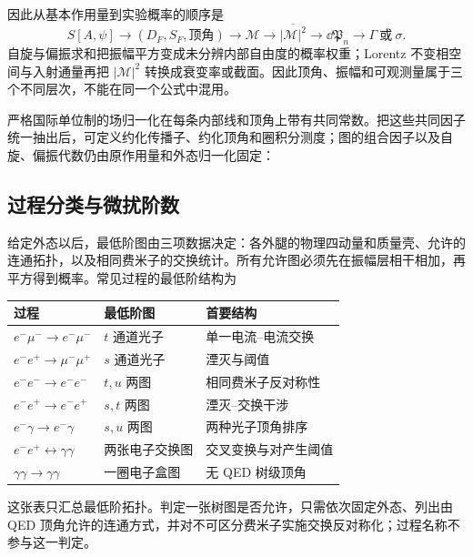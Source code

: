 因此从基本作用量到实验概率的顺序是
\begin{equation}
 {
 S[A,\psi]
 \longrightarrow
 (D_F,S_F,\text{顶角})
 \longrightarrow
 \mathcal M
 \longrightarrow
 \overline{|\mathcal M|^2}
 \longrightarrow
 \dd\mathfrak P_n
 \longrightarrow
 \Gamma\ \text{或}\ \sigma .}
 \label{eq:qed-calculation-chain-dp7}
\end{equation}
自旋与偏振求和把振幅平方变成未分辨内部自由度的概率权重；Lorentz 不变相空间与入射通量再把 $|\mathcal M|^2$ 转换成衰变率或截面。因此顶角、振幅和可观测量属于三个不同层次，不能在同一个公式中混用。

严格国际单位制的场归一化在每条内部线和顶角上带有共同常数。把这些共同因子统一抽出后，可定义约化传播子、约化顶角和圈积分测度；图的组合因子以及自旋、偏振代数仍由原作用量和外态归一化固定：








\subsection{过程分类与微扰阶数}

给定外态以后，最低阶图由三项数据决定：各外腿的物理四动量和质量壳、允许的连通拓扑，以及相同费米子的交换统计。所有允许图必须先在振幅层相干相加，再平方得到概率。常见过程的最低阶结构为
\begin{center}
\begin{tabular}{lll}
\toprule
过程 & 最低阶图 & 首要结构 \\
\midrule
$e^-\mu^-\to e^-\mu^-$ & $t$ 通道光子 & 单一电流--电流交换 \\
$e^-e^+\to\mu^-\mu^+$ & $s$ 通道光子 & 湮灭与阈值 \\
$e^-e^-\to e^-e^-$ & $t,u$ 两图 & 相同费米子反对称性 \\
$e^-e^+\to e^-e^+$ & $s,t$ 两图 & 湮灭--交换干涉 \\
$e^-\gamma\to e^-\gamma$ & $s,u$ 两图 & 两种光子顶角排序 \\
$e^-e^+\leftrightarrow\gamma\gamma$ & 两张电子交换图 & 交叉变换与对产生阈值 \\
$\gamma\gamma\to\gamma\gamma$ & 一圈电子盒图 & 无 QED 树级顶角 \\
\bottomrule
\end{tabular}
\end{center}
这张表只汇总最低阶拓扑。判定一张树图是否允许，只需依次固定外态、列出由 QED 顶角允许的连通方式，并对不可区分费米子实施交换反对称化；过程名称不参与这一判定。

